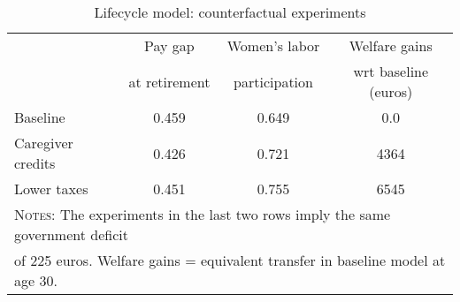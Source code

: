 \begin{table}[htbp]\caption{Lifecycle model: counterfactual experiments}\label{table:experiments}\centering\footnotesize\begin{tabular}{lccc} \toprule & Pay gap & Women's labor & Welfare gains  \\&at retirement &participation & wrt baseline (euros)  \\\midrule    Baseline                 &0.459&0.649& 0.0\\ Caregiver credits        &0.426&0.721& 4364\\ Lower taxes              &0.451&0.755& 6545\\  \bottomrule\multicolumn{4}{l}{\textsc{Notes:} The experiments in the last two rows imply the same government deficit}\\\multicolumn{4}{l}{of   225 euros. Welfare gains = equivalent transfer in baseline model at age 30. }\end{tabular}
      \end{table}